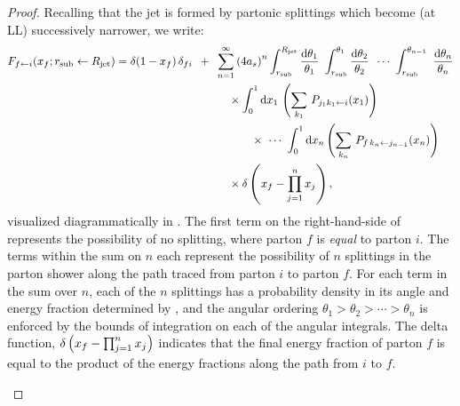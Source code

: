 \begin{proof}
Recalling that the jet is formed by partonic splittings which become (at LL) successively narrower, we write:
\begin{align}
    F_{f \leftarrow i}(x_f; \rsub \leftarrow \Rjet)
    &=
    \delta(1-x_f) \, \delta_{fi}
    \,\,\,
    +
    \,\,\,
    \sum_{n = 1}^\infty
    \le( 4 a_s \ri)^n
    \int^{\Rjet}_{\rsub} \frac{\dd\theta_1}{\theta_1}
    \,\,
    \int^{\theta_1}_{\rsub} \frac{\dd\theta_2}{\theta_2}
    \,\,\,
    \cdots
    \,\,
    \int^{\theta_{n-1}}_{\rsub}
    \,\,
    \frac{\dd\theta_n}{\theta_n}
    \notag
    \\
    &\qquad\qquad\qquad\qquad\qquad
    \label{eq:shower_fragmentation}
    \times
    \int_0^1 \dd x_1
    \,
    \le(\sum_{k_1}\,P_{j_1 k_1 \leftarrow i}(x_1)\ri)
    \\
    \notag
    &\qquad\qquad\qquad\qquad\qquad\qquad
    \times
    \,\,
    \cdots
    \,\,
    \int_0^1 \dd x_n
    \le(\sum_{k_n}\,P_{f\,k_n \leftarrow j_{n-1}}(x_n)\ri)
    \\
    \notag
    &\qquad\qquad\qquad\qquad\qquad
    \times
    \delta\le(x_f - \prod_{j=1}^n x_j\ri)
     ,
\end{align}
visualized diagrammatically in .
%
The first term on the right-hand-side of  represents the possibility of no splitting, where parton \(f\) is \emph{equal} to parton \(i\).
%
The terms within the sum on \(n\) each represent the possibility of \(n\) splittings in the parton shower along the path traced from parton \(i\) to parton \(f\).
%
For each term in the sum over \(n\), each of the \(n\) splittings has a probability density in its angle and energy fraction determined by , and the angular ordering \(\theta_1 > \theta_2 > \cdots > \theta_n\) is enforced by the bounds of integration on each of the angular integrals.
%
The delta function, \(\delta\left(x_f - \prod_{j = 1}^n x_j\right)\) indicates that the final energy fraction of parton \(f\) is equal to the product of the energy fractions along the path from \(i\) to \(f\).


\begin{figure}[t!]
    \centering


\end{figure}
\end{proof}
